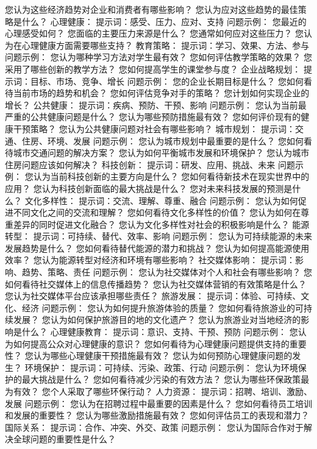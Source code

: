 \documentclass[12pt]{book}
\begin{document}
您认为这些经济趋势对企业和消费者有哪些影响？
您认为应对这些趋势的最佳策略是什么？
心理健康：
提示词：感受、压力、应对、支持
问题示例：
您最近的心理感受如何？
您面临的主要压力来源是什么？
您通常如何应对这些压力？
您认为在心理健康方面需要哪些支持？
教育策略：
提示词：学习、效果、方法、参与
问题示例：
您认为哪种学习方法对学生最有效？
您如何评估教学策略的效果？
您采用了哪些创新的教学方法？
您如何提高学生的课堂参与度？
企业战略规划：
提示词：目标、市场、竞争、增长
问题示例：
您的企业长期目标是什么？
您如何看待当前市场的趋势和机会？
您如何评估竞争对手的策略？
您计划如何实现企业的增长？
公共健康：
提示词：疾病、预防、干预、影响
问题示例：
您认为当前最严重的公共健康问题是什么？
您认为哪些预防措施最有效？
您如何评价现有的健康干预策略？
您认为公共健康问题对社会有哪些影响？
城市规划：
提示词：交通、住房、环境、发展
问题示例：
您认为城市规划中最重要的是什么？
您如何看待城市交通问题的解决方案？
您认为如何平衡城市发展和环境保护？
您认为城市住房问题应该如何解决？
科技创新：
提示词：研发、应用、挑战、未来
问题示例：
您认为当前科技创新的主要方向是什么？
您如何看待新技术在现实世界中的应用？
您认为科技创新面临的最大挑战是什么？
您对未来科技发展的预测是什么？
文化多样性：
提示词：交流、理解、尊重、融合
问题示例：
您认为如何促进不同文化之间的交流和理解？
您如何看待文化多样性的价值？
您认为如何在尊重差异的同时促进文化融合？
您认为文化多样性对社会的积极影响是什么？
能源转型：
提示词：可持续、替代、效率、影响
问题示例：
您认为可持续能源的未来发展趋势是什么？
您如何看待替代能源的潜力和挑战？
您认为如何提高能源使用效率？
您认为能源转型对经济和环境有哪些影响？
社交媒体影响：
提示词：影响、趋势、策略、责任
问题示例：
您认为社交媒体对个人和社会有哪些影响？
您如何看待社交媒体上的信息传播趋势？
您认为社交媒体营销的有效策略是什么？
您认为社交媒体平台应该承担哪些责任？
旅游发展：
提示词：体验、可持续、文化、经济
问题示例：
您认为如何提升旅游体验的质量？
您如何看待旅游业的可持续发展？
您认为如何保护旅游目的地的文化遗产？
您认为旅游业对当地经济的影响是什么？
心理健康教育：
提示词：意识、支持、干预、预防
问题示例：
您认为如何提高公众对心理健康的意识？
您如何看待为心理健康问题提供支持的重要性？
您认为哪些心理健康干预措施最有效？
您认为如何预防心理健康问题的发生？
环境保护：
提示词：可持续、污染、政策、行动
问题示例：
您认为环境保护的最大挑战是什么？
您如何看待减少污染的有效方法？
您认为哪些环保政策最为有效？
您个人采取了哪些环保行动？
人力资源：
提示词：招聘、培训、激励、发展
问题示例：
您认为在招聘过程中最重要的因素是什么？
您如何看待员工培训和发展的重要性？
您认为哪些激励措施最有效？
您如何评估员工的表现和潜力？
国际关系：
提示词：合作、冲突、外交、政策
问题示例：
您认为国际合作对于解决全球问题的重要性是什么？
\end{document}
